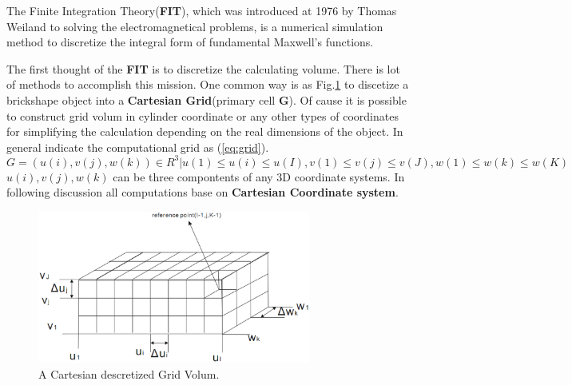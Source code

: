 
The Finite Integration Theory(\textbf{FIT}), which was introduced at 1976 by Thomas Weiland\cite{FIT_discrete_method} to solving the electromagnetical problems, is a numerical simulation method to discretize the integral form of fundamental Maxwell's functions.

The first thought of the \textbf{FIT} is to discretize the calculating volume. There is lot of methods to accomplish this mission. One common way is as Fig.\ref{fig:discretization_material} to discetize a brickshape object into a \textbf{Cartesian Grid}(primary cell \textbf{G}). Of cause it is possible to construct grid volum in cylinder coordinate or any other types of  coordinates\cite{FIT_triangular_discretization}\cite{FDTD_nonorthogonal_grids} for simplifying the calculation depending on the real dimensions of the object. In general \cite{script_FeldSim} indicate the computational grid as (\ref{eq:grid}).
\begin{equation}
G={(u(i),v(j),w(k))\in R^3|u(1)\leq u(i)\leq u(I),
													 v(1)\leq v(j)\leq v(J),
													 w(1)\leq w(k)\leq w(K)
}
\label{eq:grid}
\end{equation}
$u(i),v(j),w(k)$ can be three compontents of any 3D coordinate systems. In following discussion all computations base on \textbf{Cartesian Coordinate system}.
\begin{figure}
\includegraphics[width=0.8\textwidth]{bilder/grid_volum}
\caption{A Cartesian descretized Grid Volum.}
\label{fig:discretization_material}
\end{figure}


